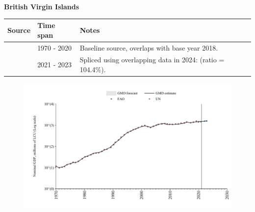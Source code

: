 \documentclass[12pt,a4paper,landscape]{article}
\begin{document}
\begin{adjustbox}{max totalsize={\paperwidth}{\paperheight},center}
\begin{minipage}[t][\textheight][t]{\textwidth}
\vspace*{0.5cm}
{}
\begin{center}
{\Large\bfseries British Virgin Islands}
\end{center}
\vspace{0.5cm}
\begin{table}[H]
\centering
\small
\begin{tabular}{|l|l|l|}
\hline
\textbf{Source} & \textbf{Time span} & \textbf{Notes} \\
\hline
\rowcolor{white}\cite{UN}& 1970 - 2020 &Baseline source, overlaps with base year 2018.\\
\rowcolor{lightgray}\cite{FAO}& 2021 - 2023 &Spliced using overlapping data in 2024: (ratio = 104.4\%).\\
\hline
\end{tabular}
\end{table}
\begin{figure}[H]
\centering
\includegraphics[width=\textwidth,height=0.6\textheight,keepaspectratio]{graphs/VGB_nGDP.pdf}
\end{figure}
\end{minipage}
\end{adjustbox}
\end{document}
